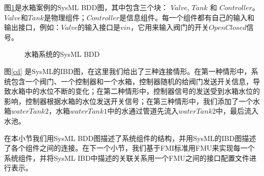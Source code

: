 图\ref{myad}是水箱案例的SysML BDD图，其中包含三个块： $Valve$, $Tank$ 和 $Controller$。 $Valve$和$Tank$是物理组件；$Controller$是信息组件。每一个组件都有自己的输入和输出接口，例如：$Valve$的输入接口是$vin$，它用来输入阀门的开关$OpenClosed$信号。
\begin{figure}[htbp]
	\caption{水箱系统的SysML BDD}
	\label{myad}
\end{figure}

图\ref{cd} 是SysML的IBD图，在这里我们给出了三种连接情形。在第一种情形中，系统包含一个阀门、一个控制器和一个水箱，控制器随机的给阀门发送开关信息，导致水箱中的水位不断的变化；在第二种情形中，控制器信号的发送受到水箱水位的影响，控制器根据水箱的水位发送开关信号；在第三种情形中，我们添加了一个水箱$waterTank2$，水箱$waterTank1$中的水通过管道先流入$waterTank2$中，最后流入水池。

\begin{figure}[htbp]
\end{figure}
在本小节我们用SysML BDD图描述了系统组件的结构，并用SysML的IBD图描述了各个组件之间的连接。在下一个小节，我们基于FMI标准用FMU来实现每一个系统组件，并将SysML IBD中描述的关联关系用一个FMU之间的接口配置文件进行表示。
